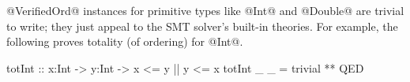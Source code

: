 


@VerifiedOrd@ instances for primitive types like @Int@ and @Double@ are trivial to
write; they just appeal to the SMT solver's built-in theories.
%
For example, the following proves totality (of ordering) for @Int@.
\begin{code}
    totInt :: x:Int -> y:Int -> {x <= y || y <= x}
    totInt _ _ = trivial ** QED
\end{code}

